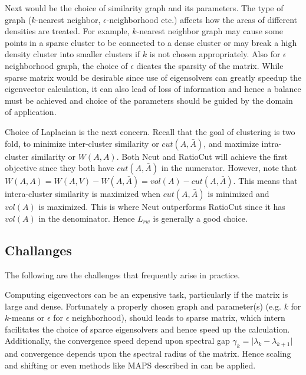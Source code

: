 \documentclass[10pt,a4paper, nocenter]{report}
\newcommand{\abs}[1]{\lvert {#1} \rvert}
\begin{document}
    Next would be the choice of similarity graph and its parameters. The type of graph ($k$-nearest neighbor, $\epsilon$-neighborhood etc.) affects how the areas of different densities are treated. For example, $k$-nearest neighbor graph may cause some points in a sparse cluster to be connected to a dense cluster or may break a high density cluster into smaller clusters if $k$ is not chosen appropriately. Also for $\epsilon$ neighborhood graph, the choice of $\epsilon$ dicates the sparsity of the matrix. While sparse matrix would be desirable since use of eigensolvers can greatly speedup the eigenvector calculation, it can also lead of loss of information and hence a balance must be achieved and choice of the parameters should be guided by the domain of application. 

    Choice of Laplacian is the next concern. Recall that the goal of clustering is two fold, to minimize inter-cluster similarity or $cut(A,\bar{A})$, and maximize intra-cluster similarity or $W(A,A)$. Both Ncut and RatioCut will achieve the first objective since they both have $cut(A,\bar{A})$ in the numerator. However, note that $W(A,A) = W(A,V) - W(A,\bar{A}) = vol(A) - cut(A,\bar{A})$. This means that intera-cluster similarity is maximized when $cut(A,\bar{A})$ is minimized and $vol(A)$ is maximized. This is where Ncut outperforms RatioCut since it has $vol(A)$ in the denominator. Hence $L_{rw}$ is generally a good choice.

    \subsection{Challanges}

    The following are the challenges that frequently arise in practice. 

    Computing eigenvectors can be an expensive task, particularly if the matrix is large and dense. Fortunately a properly chosen graph and parameter(s) (e.g. $k$ for $k$-means or $\epsilon$ for $\epsilon$ neighborhood), should leads to sparse matrix, which intern facilitates the choice of sparce eigensolvers and hence speed up the calculation. Additionally, the convergence speed depend upon spectral gap $\gamma_k = \abs{\lambda_k - \lambda_{k+1}}$ and convergence depends upon the spectral radius of the matrix. Hence scaling and shifting or even methods like MAPS described in \cite{Lu2015AcceleratedAF} can be applied. 
\end{document}
